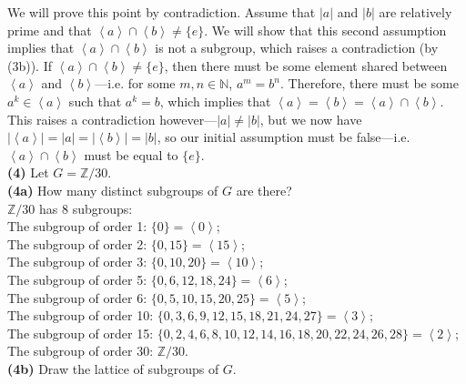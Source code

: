 \documentclass[12pt,letterpaper]{article}
\begin{document}
We will prove this point by contradiction. Assume that \(|a|\) and \(|b|\) are relatively prime and that \(\left<a\right> \cap \left<b\right> \neq \{e\}\). We will show that this second assumption implies that \(\left<a\right> \cap \left<b\right>\) is not a subgroup, which raises a contradiction (by (3b)). If \(\left<a\right> \cap \left<b\right>\neq \{e\}\), then there must be some element shared between \(\left<a\right>\) and \(\left<b\right>\)---i.e. for some \(m,n \in \mathbb{N}\), \(a^{m} = b^{n}\). Therefore, there must be some \(a^{k} \in \left<a\right>\) such that \(a^{k} = b\), which implies that \(\left<a\right> = \left<b\right> = \left<a\right> \cap \left<b\right>\). This raises a contradiction however---\(|a|\neq|b|\), but we now have \(|\left<a\right>| = |a| = |\left<b\right> | = |b|\), so our initial assumption must be false---i.e. \(\left<a\right> \cap \left<b\right>\) must be equal to \(\{e\}\). \\

\textbf{(4)} Let \(G = \mathbb{Z}/30\). \\

\textbf{(4a)} How many distinct subgroups of \(G\) are there? \\

\(\mathbb{Z}/30\) has 8 subgroups: \\

The subgroup of order 1: \(\{0\} = \left<0\right>\); \\

The subgroup of order 2: \(\{0, 15\} = \left< 15\right>\); \\

The subgroup of order 3: \(\{0,10,20\} = \left<10\right>\); \\

The subgroup of order 5: \(\{0,6,12,18,24\} = \left<6\right>\); \\

The subgroup of order 6: \(\{0,5,10,15,20,25\} = \left<5\right>\); \\

The subgroup of order 10: \(\{0,3,6,9,12,15,18,21,24,27\} = \left< 3 \right>\); \\

The subgroup of order 15: \(\{0,2,4,6,8,10,12,14,16,18,20,22,24,26,28\} = \left< 2 \right >\); \\

The subgroup of order 30: \(\mathbb{Z}/30\). \\

\textbf{(4b)} Draw the lattice of subgroups of \(G\). \\
\end{document}

